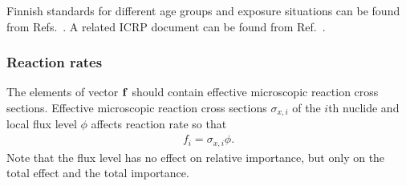 Finnish standards for different age groups and exposure situations can be found from Refs.~\cite{ST72,ST73}. A related ICRP document can be found from Ref.~\cite{ircp30part1}.






\subsubsection*{Reaction rates}
\label{sect:reaction rates}

The elements of vector $\mathbf{f}$ should contain effective microscopic reaction cross sections. Effective microscopic reaction cross sections $\sigma_{x,i}$ of the $i$th nuclide and local flux level $\phi$ affects reaction rate so that
%
\begin{gather}
f_i = \sigma_{x,i}\phi.
\end{gather}
%
Note that the flux level has no effect on relative importance, but only on the total effect and the total importance.

